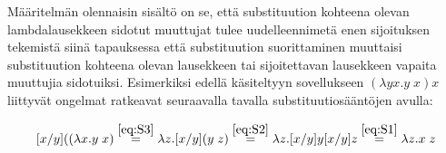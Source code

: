 Määritelmän olennaisin sisältö on se, että substituution kohteena olevan lambdalausekkeen sidotut muuttujat tulee uudelleennimetä enen sijoituksen tekemistä siinä tapauksessa että substituution suorittaminen muuttaisi substituution kohteena olevan lausekkeen tai sijoitettavan lausekkeen vapaita muuttujia sidotuiksi. Esimerkiksi edellä käsiteltyyn sovellukseen $(\lambda yx . y \; x) x$ liittyvät ongelmat ratkeavat seuraavalla tavalla substituutiosääntöjen avulla:

\[ [ x / y]((\lambda x . y \; x)  \stackrel{\eqref{eq:S3}}{=} \\ 
	\lambda z . [ x / y](y \; z) \stackrel{\eqref{eq:S2}}{=} \\
	\lambda z . [ x / y]y [ x / y]z \stackrel{\eqref{eq:S1}}{=} \lambda z . x \; z	
\]   

